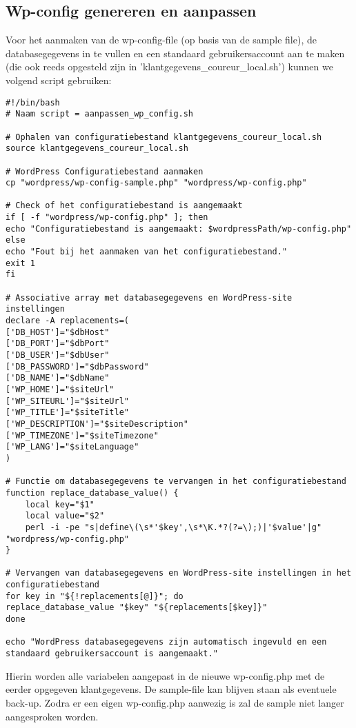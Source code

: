 \subsection{Wp-config genereren en aanpassen}
Voor het aanmaken van de wp-config-file (op basis van de sample file), de databasegegevens in te vullen en een standaard gebruikersaccount aan te maken (die ook reeds opgesteld zijn in 'klantgegevens\_coureur\_local.sh') kunnen we volgend script gebruiken:
\label{aanpassen_config_script}\begin{verbatim}
#!/bin/bash
# Naam script = aanpassen_wp_config.sh

# Ophalen van configuratiebestand klantgegevens_coureur_local.sh
source klantgegevens_coureur_local.sh

# WordPress Configuratiebestand aanmaken
cp "wordpress/wp-config-sample.php" "wordpress/wp-config.php"

# Check of het configuratiebestand is aangemaakt
if [ -f "wordpress/wp-config.php" ]; then
echo "Configuratiebestand is aangemaakt: $wordpressPath/wp-config.php"
else
echo "Fout bij het aanmaken van het configuratiebestand."
exit 1
fi

# Associative array met databasegegevens en WordPress-site instellingen
declare -A replacements=(
['DB_HOST']="$dbHost"
['DB_PORT']="$dbPort"
['DB_USER']="$dbUser"
['DB_PASSWORD']="$dbPassword"
['DB_NAME']="$dbName"
['WP_HOME']="$siteUrl"
['WP_SITEURL']="$siteUrl"
['WP_TITLE']="$siteTitle"
['WP_DESCRIPTION']="$siteDescription"
['WP_TIMEZONE']="$siteTimezone"
['WP_LANG']="$siteLanguage"
)

# Functie om databasegegevens te vervangen in het configuratiebestand
function replace_database_value() {
    local key="$1"
    local value="$2"
    perl -i -pe "s|define\(\s*'$key',\s*\K.*?(?=\);)|'$value'|g" "wordpress/wp-config.php"
}

# Vervangen van databasegegevens en WordPress-site instellingen in het configuratiebestand
for key in "${!replacements[@]}"; do
replace_database_value "$key" "${replacements[$key]}"
done

echo "WordPress databasegegevens zijn automatisch ingevuld en een standaard gebruikersaccount is aangemaakt."
\end{verbatim}
Hierin worden alle variabelen aangepast in de nieuwe wp-config.php met de eerder opgegeven klantgegevens. De sample-file kan blijven staan als eventuele back-up. Zodra er een eigen wp-config.php aanwezig is zal de sample niet langer aangesproken worden.
\\\\
